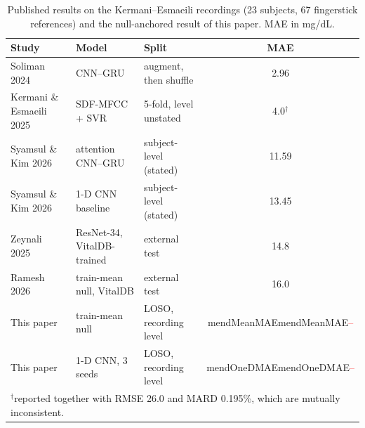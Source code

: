 \documentclass[journal]{IEEEtran}
\newcommand{\m}[1]{\ifcsname #1\endcsname\csname #1\endcsname\else\textcolor{red}{--}\fi}
\begin{document}
\begin{table}[t]
  \caption{Published results on the Kermani--Esmaeili recordings (23 subjects,
           67 fingerstick references) and the null-anchored result of this
           paper.  MAE in mg/dL.}
  \label{tab:prior}
  \centering
  \scriptsize
  \setlength{\tabcolsep}{2.5pt}
  \begin{tabular}{@{}p{2.45cm}p{2.1cm}p{2.3cm}c@{}}
    \toprule
    \textbf{Study} & \textbf{Model} & \textbf{Split} & \textbf{MAE} \\
    \midrule
    Soliman 2024~\cite{soliman2024} & CNN--GRU & augment, then shuffle & 2.96 \\
    Kermani \& Esmaeili 2025~\cite{kermani2025} & SDF-MFCC + SVR & 5-fold, level unstated & 4.0$^\dagger$ \\
    Syamsul \& Kim 2026~\cite{syamsul2026} & attention CNN--GRU & subject-level (stated) & 11.59 \\
    Syamsul \& Kim 2026~\cite{syamsul2026} & 1-D CNN baseline & subject-level (stated) & 13.45 \\
    Zeynali 2025~\cite{zeynali2025} & ResNet-34, VitalDB-trained & external test & 14.8 \\
    Ramesh 2026~\cite{ramesh2026} & train-mean null, VitalDB & external test & 16.0 \\
    \midrule
    This paper & train-mean null & LOSO, recording level & \m{mendMeanMAE} \\
    This paper & 1-D CNN, 3 seeds & LOSO, recording level & \m{mendOneDMAE} \\
    \bottomrule
    \multicolumn{4}{p{0.95\columnwidth}}{$^\dagger$reported together with RMSE 26.0 and MARD 0.195\%, which are mutually inconsistent.}
  \end{tabular}
\end{table}
\end{document}
